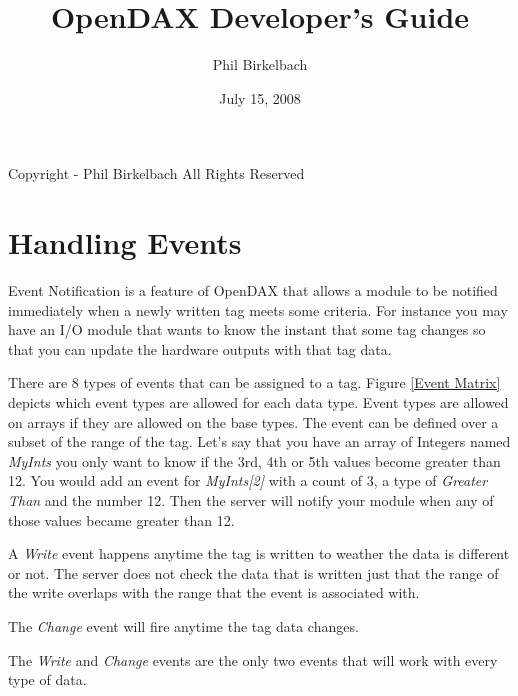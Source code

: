 

\title{OpenDAX Developer's Guide}
\date{July 15, 2008}
\author{Phil Birkelbach}


\maketitle
\begin{flushleft}
Copyright  - Phil Birkelbach\linebreak
All Rights Reserved

\end{flushleft}

\tableofcontents
\newpage
{}







\chapter{Handling Events}
Event Notification is a feature of OpenDAX that allows a module to be notified immediately when a newly written tag meets some criteria.  For instance you may have an I/O module that wants to know the instant that some tag changes so that you can update the hardware outputs with that tag data.

There are 8 types of events that can be assigned to a tag.  Figure \ref{Event Matrix} depicts which event types are allowed for each data type.  Event types are allowed on arrays if they are allowed on the base types.  The event can be defined over a subset of the range of the tag.  Let's say that you have an array of Integers named \textit{MyInts} you only want to know if the 3rd, 4th or 5th values become greater than 12.  You would add an event for \textit{MyInts[2]} with a count of 3, a type of \textit{Greater Than} and the number 12.  Then the server will notify your module when any of those values became greater than 12.

A \textit{Write} event happens anytime the tag is written to weather the data is different or not.  The server does not check the data that is written just that the range of the write overlaps with the range that the event is associated with.

The \textit{Change} event will fire anytime the tag data changes.

The \textit{Write} and \textit{Change} events are the only two events that will work with every type of data.

